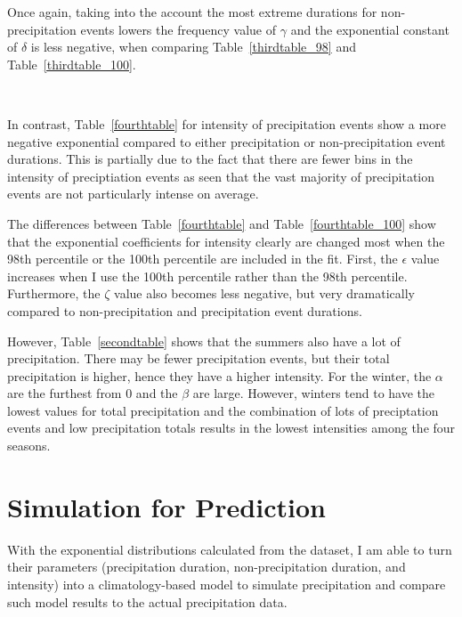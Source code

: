 \documentclass[11pt]{report}
\begin{document}
Once again, taking into the account the most extreme durations for
non-precipitation events lowers the frequency value of $\gamma$ and the
exponential constant of $\delta$ is less negative, when comparing
Table~\ref{thirdtable_98} and Table~\ref{thirdtable_100}.

\





In contrast, Table~\ref{fourthtable} for intensity of precipitation events
show a more negative exponential compared to either precipitation or
non-precipitation event durations. This is partially due to the fact that
there are fewer bins in the intensity of preciptiation events as seen that
the vast majority of precipitation events are not particularly intense on
average.

The differences between Table~\ref{fourthtable} and
Table~\ref{fourthtable_100} show that the exponential coefficients for
intensity clearly are changed most when the 98th percentile or the 100th
percentile are included in the fit. First, the $\epsilon$ value increases
when I use the 100th percentile rather than the 98th
percentile. Furthermore, the $\zeta$ value also becomes less
negative, but very dramatically compared to non-precipitation and
precipitation event durations.

However, Table~\ref{secondtable} shows that the summers also have a lot of
precipitation. There may be fewer precipitation events, but their total
precipitation is higher, hence they have a higher intensity.  For the
winter, the $\alpha$ are the furthest from 0 and the $\beta$ are
large. However, winters tend to have the lowest values for total
precipitation and the combination of lots of preciptation events and low
precipitation totals results in the lowest intensities among the four
seasons.


\clearpage

\section{Simulation for Prediction}\label{sec:sfp}

With the exponential distributions calculated from the dataset, I am able
to turn their parameters (precipitation duration, non-precipitation
duration, and intensity) into a climatology-based model to simulate
precipitation and compare such model results to the actual precipitation
data.
\end{document}
